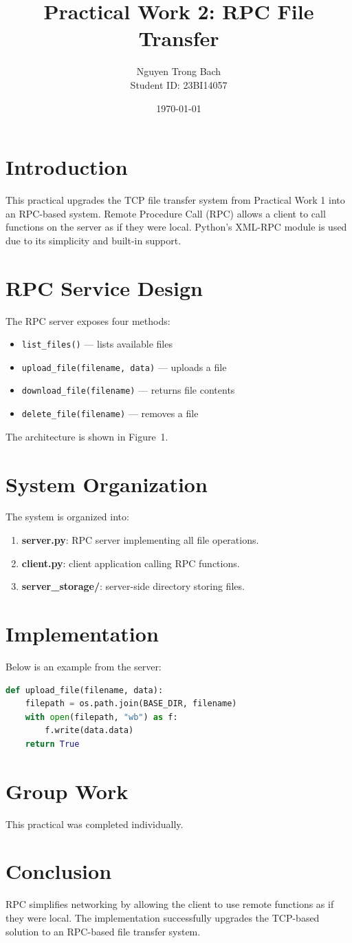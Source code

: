 \documentclass[a4paper,11pt]{article}
\title{Practical Work 2: RPC File Transfer}
\author{Nguyen Trong Bach \\ Student ID: 23BI14057}
\date{\today}
\begin{document}
\maketitle

\section{Introduction}
This practical upgrades the TCP file transfer system from Practical Work 1 into an RPC-based system. Remote Procedure Call (RPC) allows a client to call functions on the server as if they were local. Python's XML-RPC module is used due to its simplicity and built-in support.

\section{RPC Service Design}
The RPC server exposes four methods:
\begin{itemize}
    \item \texttt{list\_files()} — lists available files
    \item \texttt{upload\_file(filename, data)} — uploads a file
    \item \texttt{download\_file(filename)} — returns file contents
    \item \texttt{delete\_file(filename)} — removes a file
\end{itemize}

The architecture is shown in Figure~1.

\section{System Organization}
The system is organized into:
\begin{enumerate}
    \item \textbf{server.py}: RPC server implementing all file operations.
    \item \textbf{client.py}: client application calling RPC functions.
    \item \textbf{server\_storage/}: server-side directory storing files.
\end{enumerate}

\section{Implementation}
Below is an example from the server:
\begin{lstlisting}[language=Python]
def upload_file(filename, data):
    filepath = os.path.join(BASE_DIR, filename)
    with open(filepath, "wb") as f:
        f.write(data.data)
    return True
\end{lstlisting}

\section{Group Work}
This practical was completed individually.

\section{Conclusion}
RPC simplifies networking by allowing the client to use remote functions as if they were local. The implementation successfully upgrades the TCP-based solution to an RPC-based file transfer system.
\end{document}
